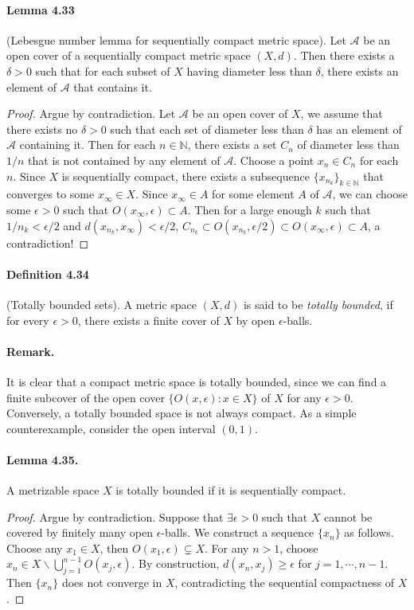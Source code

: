 \documentclass{article}
\numberwithin{equation}{section}
\theoremstyle{plain}
\theoremstyle{definition}
\begin{document}
\paragraph{Lemma 4.33\label{lemma:4.33}} (Lebesgue number lemma for sequentially compact metric space). Let $\mathscr{A}$ be an open cover of a sequentially compact metric space $(X,d)$. Then there exists a $\delta > 0$ such that for each subset of $X$ having diameter less than $\delta$, there exists an element of $\mathscr{A}$ that contains it.
\begin{proof}
Argue by contradiction. Let $\mathscr{A}$ be an open cover of $X$, we assume that there exists no $\delta >0$ such that each set of diameter less than $\delta$ has an element of $\mathscr{A}$ containing it. Then for each $n\in\mathbb{N}$, there exists a set $C_n$ of diameter less than $1/n$ that is not contained by any element of $\mathscr{A}$. Choose a point $x_n\in C_n$ for each $n$. Since $X$ is sequentially compact, there exists a subsequence $\{x_{n_k}\}_{k\in\mathbb{N}}$ that converges to some $x_\infty\in X$. Since $x_\infty\in A$ for some element $A$ of $\mathscr{A}$, we can choose some $\epsilon > 0$ such that $O(x_\infty,\epsilon)\subset A$. Then for a large enough $k$ such that $1/n_k < \epsilon / 2$ and $d(x_{n_k},x_\infty) < \epsilon/2$, $C_{n_k}\subset O(x_{n_k},\epsilon/2)\subset O(x_\infty, \epsilon)\subset A$, a contradiction!
\end{proof}

\paragraph{Definition 4.34\label{def:4.34}} (Totally bounded sets). A metric space $(X,d)$ is said to be \textit{totally bounded}, if for every $\epsilon >0$, there exists a finite cover of $X$ by open $\epsilon$-balls.

\paragraph{Remark.} It is clear that a compact metric space is totally bounded, since we can find a finite subcover of the open cover $\{O(x,\epsilon):x\in X\}$ of $X$ for any $\epsilon > 0$. Conversely, a totally bounded space is not always compact. As a simple counterexample, consider the open interval $(0,1)$.

\paragraph{Lemma 4.35.\label{lemma:4.35}} A metrizable space $X$ is totally bounded if it is sequentially compact.
\begin{proof}
Argue by contradiction. Suppose that $\exists\epsilon>0$ such that $X$ cannot be covered by finitely many open $\epsilon$-balls. We construct a sequence $\{x_n\}$ as follows. Choose any $x_1\in X$, then $O(x_1,\epsilon)\subsetneq X$. For any $n>1$, choose $x_n\in X\backslash\bigcup_{j=1}^{n-1}O(x_j,\epsilon)$. By construction, $d(x_{n},x_j)\geq\epsilon$ for $j=1,\cdots,n-1$. Then $\{x_n\}$ does not converge in $X$, contradicting the sequential compactness of $X$.
\end{proof}
\end{document}
